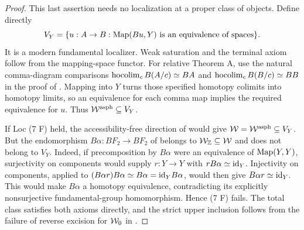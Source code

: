 \begin{proof}
This last assertion needs no localization at a proper class of objects. Define directly
\[
 V_Y=\{u:A\to B:\operatorname{Map}(Bu,Y)\text{ is an equivalence of spaces}\}.
\]
It is a modern fundamental localizer. Weak saturation and the terminal axiom follow from the mapping-space functor. For relative Theorem A, use the natural comma-diagram comparisons $\operatorname{hocolim}_c B(A/c)\simeq BA$ and $\operatorname{hocolim}_c B(B/c)\simeq BB$ in the proof of . Mapping into $Y$ turns those specified homotopy colimits into homotopy limits, so an equivalence for each comma map implies the required equivalence for $u$. Thus $\mathcal{W}^{\mathrm{asph}}\subseteq V_Y$.

If Loc (7 F) held, the accessibility-free direction of  would give $\mathcal{W}=\mathcal{W}^{\mathrm{asph}}\subseteq V_Y$. But the endomorphism $B\alpha:BF_2\to BF_2$ of  belongs to $\mathcal{W}_{\mathbb Z}\subseteq\mathcal{W}$ and does not belong to $V_Y$. Indeed, if precomposition by $B\alpha$ were an equivalence of $\operatorname{Map}(Y,Y)$, surjectivity on components would supply $r:Y\to Y$ with $rB\alpha\simeq\mathrm{id}_Y$. Injectivity on components, applied to $(B\alpha r)B\alpha\simeq B\alpha=\mathrm{id}_YB\alpha$, would then give $B\alpha r\simeq\mathrm{id}_Y$. This would make $B\alpha$ a homotopy equivalence, contradicting its explicitly nonsurjective fundamental-group homomorphism. Hence (7 F) fails. The total class satisfies both axioms directly, and the strict upper inclusion follows from the failure of reverse excision for $\mathcal{W}_0$ in .
\end{proof}

